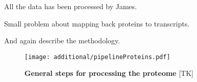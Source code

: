 All the data has been processed by James.

Small problem about mapping back proteins to transcripts.


And again describe the methodology.

  \begin{figure}
      \texttt{[image: additional/pipelineProteins.pdf]}\centering
      \caption[General steps for processing the proteome
      data]{\label{fig:pipelineProt}\textbf{General steps for processing the
      proteome} [TK] }
  \end{figure}

